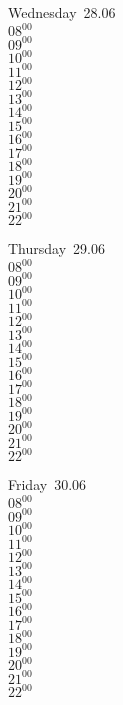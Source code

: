 \documentclass[11pt,a4paper]{book}\usepackage[]{graphicx}\usepackage[]{color}
\begin{document}
\begin{weekdaybox}
  Wednesday~28.06\\
  { 
  \vfill
  $08^{00}$\\
$09^{00}$\\
$10^{00}$\\
$11^{00}$\\
$12^{00}$\\
$13^{00}$\\
$14^{00}$\\
$15^{00}$\\
$16^{00}$\\
$17^{00}$\\
$18^{00}$\\
$19^{00}$\\
$20^{00}$\\
$21^{00}$\\
$22^{00}$\\
  }
\end{weekdaybox}
\clearpage
\begin{headerbox}
\end{headerbox}
\begin{weekdaybox}
  Thursday~29.06\\
  { 
  \vfill
  $08^{00}$\\
$09^{00}$\\
$10^{00}$\\
$11^{00}$\\
$12^{00}$\\
$13^{00}$\\
$14^{00}$\\
$15^{00}$\\
$16^{00}$\\
$17^{00}$\\
$18^{00}$\\
$19^{00}$\\
$20^{00}$\\
$21^{00}$\\
$22^{00}$\\
  }
\end{weekdaybox} 
\begin{weekdaybox}
  Friday~30.06\\
  { 
  \vfill
  $08^{00}$\\
$09^{00}$\\
$10^{00}$\\
$11^{00}$\\
$12^{00}$\\
$13^{00}$\\
$14^{00}$\\
$15^{00}$\\
$16^{00}$\\
$17^{00}$\\
$18^{00}$\\
$19^{00}$\\
$20^{00}$\\
$21^{00}$\\
$22^{00}$\\
  }
\end{weekdaybox}
\end{document}
